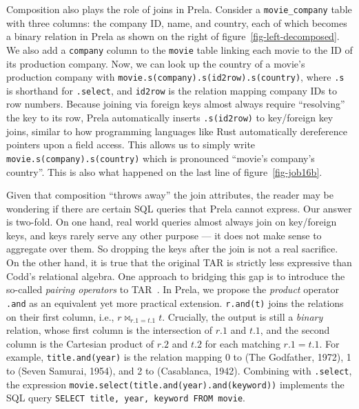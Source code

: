 \documentclass[sigconf,screen,pbalance]{cidr-2027}
\newcommand{\noun}[1]{\textsf{#1}}
\newcommand{\code}{\lstinline[style=prela]}
\newcommand{\sql}{\lstinline[style=sql]}
\begin{document}
Composition also plays the role of joins in Prela.
Consider a \code|movie_company| table with three columns: the company ID, name, and country, each of which becomes a binary relation in Prela as shown on the right of figure~\ref{fig-left-decomposed}.
We also add a \code|company| column to the \code|movie| table linking each movie to the ID of its production company.
Now, we can look up the country of a movie's production company with \code|movie.s(company).s(id2row).s(country)|, where \code|.s| is shorthand for \code|.select|, and \code|id2row| is the relation mapping company IDs to row numbers.
Because joining via foreign keys almost always require ``resolving'' the key to its row, Prela automatically inserts \code|.s(id2row)| to key/foreign key joins, similar to how programming languages like Rust automatically dereference pointers upon a field access.
This allows us to simply write \code|movie.s(company).s(country)| which is pronounced ``movie's company's country''.
This is also what happened on the last line of figure~\ref{fig-job16b}.

Given that composition ``throws away'' the join attributes, the reader may be wondering if there are certain SQL queries that Prela cannot express.
Our answer is two-fold.
On one hand, real world queries almost always join on key/foreign keys, and keys rarely serve any other purpose --- it does not make sense to aggregate over them.
So dropping the keys after the join is not a real sacrifice.
On the other hand, it is true that the original \noun{TAR} is strictly less expressive than Codd's relational algebra.
One approach to bridging this gap is to introduce the so-called \emph{pairing operators} to \noun{TAR}~\cite{DBLP:books/mk/freytagMV91/GyssensSG91}.
In Prela, we propose the \emph{product} operator \code|.and| as an equivalent yet more practical extension.
\code|r.and(t)| joins the relations on their first column, i.e., $r \bowtie_{r.1 = t.1} t$.
Crucially, the output is still a \emph{binary} relation, whose first column is the intersection of $r.1$ and $t.1$, and the second column is the Cartesian product of $r.2$ and $t.2$ for each matching $r.1 = t.1$.
For example, \code|title.and(year)| is the relation mapping 0 to (The Godfather, 1972), 1 to (Seven Samurai, 1954), and 2 to (Casablanca, 1942).
Combining with \code|.select|, the expression \code|movie.select(title.and(year).and(keyword))| implements the SQL query \sql|SELECT title, year, keyword FROM movie|.
\end{document}
